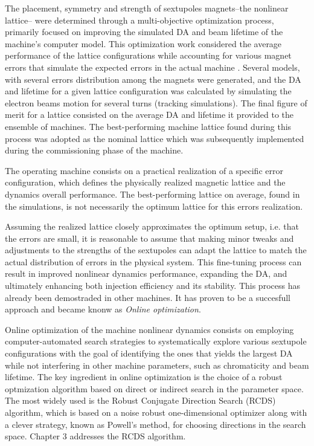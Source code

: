 The placement, symmetry and strength of sextupoles magnets--the nonlinear lattice-- were determined through a multi-objective optimization process, primarily focused on improving the simulated DA and beam lifetime of the machine's computer model\cite{de_sa_optimization_2016, dester_energy_2017}. This optimization work considered the average performance of the lattice configurations while accounting for various magnet errors that simulate the expected errors in the actual machine \cite{de_sa_optimization_2016}. Several models, with several errors distribution among the magnets were generated, and the DA and lifetime for a given lattice configuration was calculated by simulating the electron beams motion for several turns (tracking simulations). The final figure of merit for a lattice consisted on the average DA and lifetime it provided to the ensemble of machines. The best-performing machine lattice found during this process was adopted as the nominal lattice which was subsequently implemented during the commissioning phase of the machine.

The operating machine consists on a practical realization of a specific error configuration, which defines the physically realized magnetic lattice and the dynamics overall performance. The best-performing lattice on average, found in the simulations, is not necessarily the optimum lattice for this errors realization.

Assuming the realized lattice closely approximates the optimum setup, i.e. that the errors are small, it is reasonable to assume that making minor tweaks and adjustments to the strengths of the sextupoles can adapt the lattice to match the actual distribution of errors in the physical system. This fine-tuning process can result in improved nonlinear dynamics performance, expanding the DA, and ultimately enhancing both injection efficiency and its stability. This process has already been demostraded in other machines. It has proven to be a succesfull approach and became knonw as \textit{Online optimization}.

Online optimization of the machine nonlinear dynamics consists on employing computer-automated search strategies to systematically explore various sextupole configurations with the goal of identifying the ones that yields the largest DA while not interfering in other machine parameters, such as chromaticity and beam lifetime. The key ingredient in online optimization is the choice of a robust optmization algorithm based on direct or indirect search in the parameter space. The most widely used is the Robust Conjugate Direction Search (RCDS) algorithm, which is based on a noise robust one-dimensional optimizer along with a clever strategy, known as Powell's method, for choosing directions in the search space. Chapter 3 addresses the RCDS algorithm.

